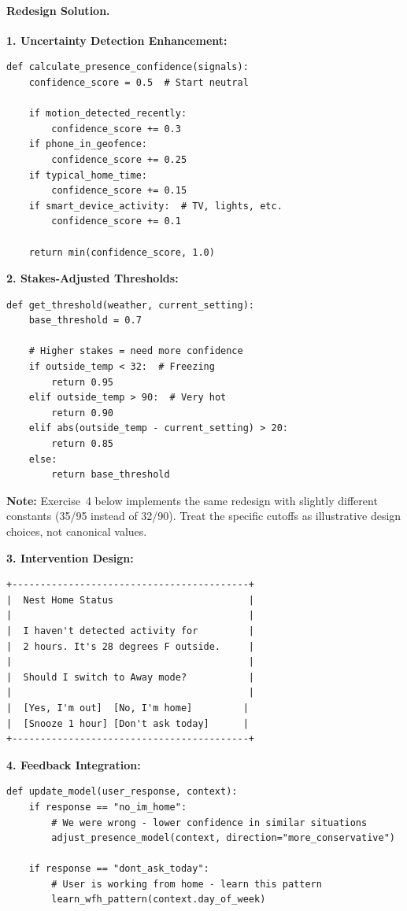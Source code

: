 \paragraph{Redesign Solution.}

\textbf{1. Uncertainty Detection Enhancement:}
\begin{lstlisting}[style=python, caption={Improved presence confidence calculation}]
def calculate_presence_confidence(signals):
    confidence_score = 0.5  # Start neutral

    if motion_detected_recently:
        confidence_score += 0.3
    if phone_in_geofence:
        confidence_score += 0.25
    if typical_home_time:
        confidence_score += 0.15
    if smart_device_activity:  # TV, lights, etc.
        confidence_score += 0.1

    return min(confidence_score, 1.0)
\end{lstlisting}

\textbf{2. Stakes-Adjusted Thresholds:}
\begin{lstlisting}[style=python, caption={Stakes-adjusted presence threshold}]
def get_threshold(weather, current_setting):
    base_threshold = 0.7

    # Higher stakes = need more confidence
    if outside_temp < 32:  # Freezing
        return 0.95
    elif outside_temp > 90:  # Very hot
        return 0.90
    elif abs(outside_temp - current_setting) > 20:
        return 0.85
    else:
        return base_threshold
\end{lstlisting}

\textbf{Note:} Exercise~4 below implements the same redesign with slightly different constants (35/95 instead of 32/90). Treat the specific cutoffs as illustrative design choices, not canonical values.

\textbf{3. Intervention Design:}
\begin{verbatim}
+------------------------------------------+
|  Nest Home Status                        |
|                                          |
|  I haven't detected activity for         |
|  2 hours. It's 28 degrees F outside.     |
|                                          |
|  Should I switch to Away mode?           |
|                                          |
|  [Yes, I'm out]  [No, I'm home]         |
|  [Snooze 1 hour] [Don't ask today]      |
+------------------------------------------+
\end{verbatim}

\textbf{4. Feedback Integration:}
\begin{lstlisting}[style=python, caption={Feedback integration for Nest redesign}]
def update_model(user_response, context):
    if response == "no_im_home":
        # We were wrong - lower confidence in similar situations
        adjust_presence_model(context, direction="more_conservative")

    if response == "dont_ask_today":
        # User is working from home - learn this pattern
        learn_wfh_pattern(context.day_of_week)
\end{lstlisting}

